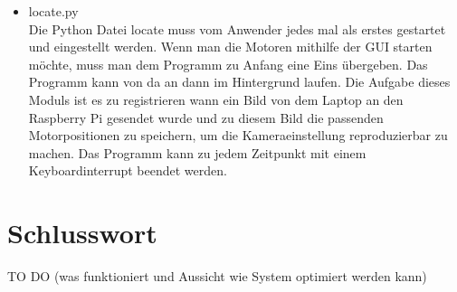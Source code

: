 \documentclass[12pt,a4paper,bibliography=totocnumbered,listof=totocnumbered]{scrartcl}
\begin{document}
\begin{itemize}
\begin{itemize}
\item locate.py\\
Die Python Datei \glqq locate\grqq{} muss vom Anwender jedes mal als erstes gestartet und eingestellt werden. Wenn man die Motoren mithilfe der GUI starten möchte, muss man dem Programm zu Anfang eine Eins übergeben. Das Programm kann von da an dann im Hintergrund laufen. Die Aufgabe dieses Moduls ist es zu registrieren wann ein Bild von dem Laptop an den Raspberry Pi gesendet wurde und zu diesem Bild die passenden Motorpositionen zu speichern, um die Kameraeinstellung reproduzierbar zu machen. Das Programm kann zu jedem Zeitpunkt mit einem Keyboardinterrupt beendet werden.
\end{itemize} 
\end{itemize}

\section{Schlusswort}
TO DO (was funktioniert und Aussicht wie System optimiert werden kann)

\newpage
\appendix
\end{document}
